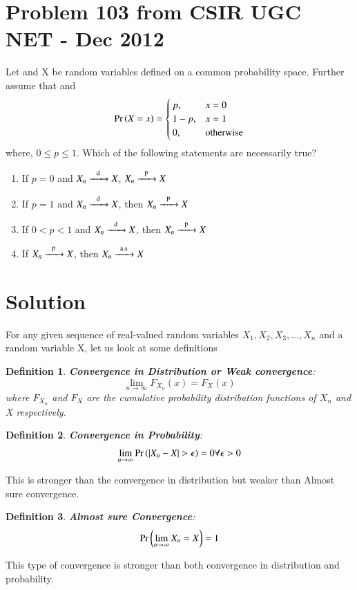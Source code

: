 \documentclass[journal,12pt,twocolumn]{IEEEtran}
\newtheorem{definition}{Definition}
\begin{document}
\section{\textbf{Problem 103 from CSIR UGC NET - Dec 2012}}
Let  and X be random variables defined on a common probability space. Further assume that  and
 \begin{align}
\Pr\left(X = x\right) =\begin{cases}
    p, & x = 0  \\
    1-p, & x =1 \\
     0, &\text{otherwise} 
\end{cases}\end{align}
where, $0 \leq p \leq 1$. Which of the following statements are necessarily true?
\begin{enumerate}
    \item If $p = 0$ and $X_n \ce{->[d]} X$, $X_n \ce{->[p]} X$ 
    \item If $p = 1$ and $X_n \ce{->[d]} X$, then $X_n  \ce{->[p]} X$
    \item If $0<p<1$ and $X_n \ce{->[d]} X$, then $X_n \ce{->[p]} X$
    \item If $X_n \ce{->[p]} X$, then $X_n  \ce{->T[a.s]} X$
\end{enumerate}
\section{\textbf{Solution}}
For any given sequence of real-valued random variables $X_1,X_2,X_3, \dots ,X_n$ and a random variable X, let us look at some definitions
\begin{definition}
 \textbf{Convergence in Distribution or Weak convergence}:
    \begin{equation}
    \lim_{n \rightarrow \infty} F_{X_n}(x) = F_X(x)
\end{equation}
where $F_{X_n}$ and $F_X$ are the cumulative probability distribution functions of $X_n$ and X respectively.
\end{definition}
\begin{definition}
 \textbf{Convergence in Probability}:
    \begin{align}
    \lim_{n \rightarrow \infty} \Pr\left(|X_n - X| > \epsilon\right) = 0 \forall \epsilon > 0
\end{align}
\end{definition}
This is stronger than the convergence in distribution but weaker than Almost sure convergence.
\begin{definition}
 \textbf{Almost sure Convergence}:
    \begin{align}
  \Pr\left(\lim_{n \rightarrow \infty} X_n = X\right) = 1  
\end{align}
\end{definition}
This type of convergence is stronger than both convergence in distribution and probability.
\end{document}
